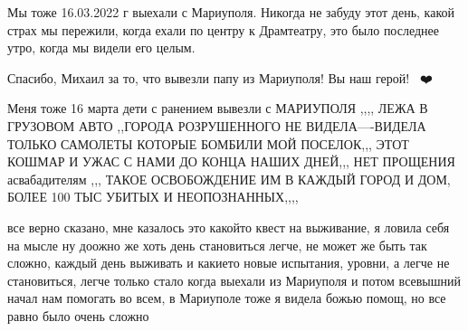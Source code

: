 
Мы тоже 16.03.2022 г выехали с Мариуполя. Никогда не забуду этот день, какой
страх мы пережили, когда ехали по центру к Драмтеатру, это было последнее утро,
когда мы видели его целым.


Спасибо, Михаил за то, что вывезли папу из Мариуполя! Вы наш герой!🙏💪🏻❤️


Меня тоже 16 марта дети с ранением вывезли с МАРИУПОЛЯ ,,,, ЛЕЖА В ГРУЗОВОМ АВТО
,,ГОРОДА РОЗРУШЕННОГО НЕ ВИДЕЛА----ВИДЕЛА ТОЛЬКО САМОЛЕТЫ КОТОРЫЕ БОМБИЛИ МОЙ
ПОСЕЛОК,,, ЭТОТ КОШМАР И УЖАС С НАМИ ДО КОНЦА НАШИХ ДНЕЙ,,, НЕТ ПРОЩЕНИЯ
асвабадителям ,,, ТАКОЕ ОСВОБОЖДЕНИЕ ИМ В КАЖДЫЙ ГОРОД И ДОМ, БОЛЕЕ 100 ТЫС
УБИТЫХ И НЕОПОЗНАННЫХ,,,,


все верно сказано, мне казалось это какойто квест на выживание, я ловила себя на
мысле ну доожно же хоть день становиться легче, не может же быть так сложно,
каждый день выживать и какието новые испытания, уровни, а легче не
становиться, легче только стало когда выехали из Мариуполя и потом всевышний
начал нам помогать во всем, в Мариуполе тоже я видела божью помощ, но все равно
было очень сложно

